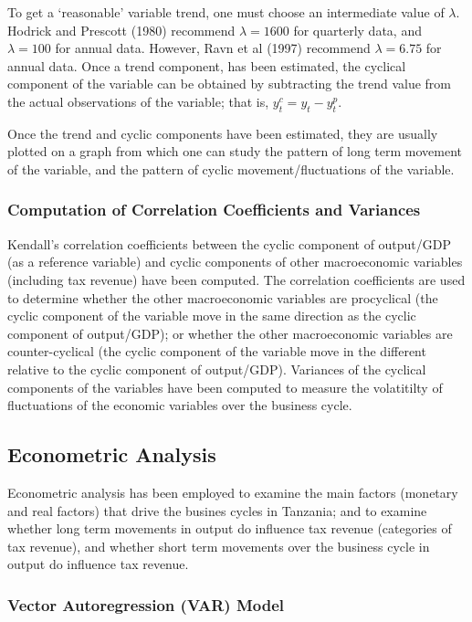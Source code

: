 \documentclass[12pt,a4paper,final]{article}
\begin{document}
To get a `reasonable' variable trend, one must choose an intermediate value of $\lambda$.  Hodrick and Prescott (1980) recommend $\lambda = 1600$ for quarterly data, and $\lambda = 100$ for annual data.  However, Ravn et al (1997) recommend $\lambda = 6.75$ for annual data. Once a trend component, has been estimated, the cyclical component of the variable can be obtained by subtracting the trend value from the actual observations of the variable; that is, $y_t^c = y_t - y_t^p$. 

Once the trend and cyclic components have been estimated, they are usually plotted on a graph from which one can study the pattern of long term movement of the variable, and the pattern of cyclic movement/fluctuations of the variable.



\subsubsection{Computation of Correlation Coefficients and Variances}

Kendall's correlation coefficients between the cyclic component of output/GDP (as a reference variable) and cyclic components of other macroeconomic variables (including tax revenue) have been computed.  The correlation coefficients  are used to determine whether the other macroeconomic variables are  procyclical (the cyclic component of the variable move in the same direction as the cyclic component of output/GDP); or whether the other macroeconomic variables are counter-cyclical (the cyclic component of the variable move in the different relative to the cyclic component of output/GDP). Variances of the cyclical components of the variables have been computed to measure the volatitilty of fluctuations of the economic variables over the business cycle.

\subsection{Econometric Analysis}

Econometric analysis has been employed to examine the main factors (monetary and real factors) that drive the busines cycles in Tanzania; and to examine whether long term movements in output do influence tax revenue (categories of tax revenue), and whether short term movements over the business cycle in output do influence tax revenue.

\subsubsection{Vector Autoregression (VAR) Model} 
\end{document}
